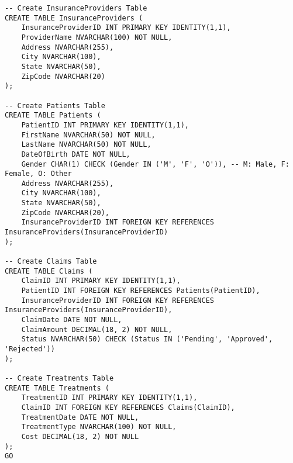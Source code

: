 \begin{lstlisting}[style=sqlstyle, caption={SQL query to Create Database}]
-- Create InsuranceProviders Table
CREATE TABLE InsuranceProviders (
    InsuranceProviderID INT PRIMARY KEY IDENTITY(1,1),
    ProviderName NVARCHAR(100) NOT NULL,
    Address NVARCHAR(255),
    City NVARCHAR(100),
    State NVARCHAR(50),
    ZipCode NVARCHAR(20)
);

-- Create Patients Table
CREATE TABLE Patients (
    PatientID INT PRIMARY KEY IDENTITY(1,1),
    FirstName NVARCHAR(50) NOT NULL,
    LastName NVARCHAR(50) NOT NULL,
    DateOfBirth DATE NOT NULL,
    Gender CHAR(1) CHECK (Gender IN ('M', 'F', 'O')), -- M: Male, F: Female, O: Other
    Address NVARCHAR(255),
    City NVARCHAR(100),
    State NVARCHAR(50),
    ZipCode NVARCHAR(20),
    InsuranceProviderID INT FOREIGN KEY REFERENCES InsuranceProviders(InsuranceProviderID)
);

-- Create Claims Table
CREATE TABLE Claims (
    ClaimID INT PRIMARY KEY IDENTITY(1,1),
    PatientID INT FOREIGN KEY REFERENCES Patients(PatientID),
    InsuranceProviderID INT FOREIGN KEY REFERENCES InsuranceProviders(InsuranceProviderID),
    ClaimDate DATE NOT NULL,
    ClaimAmount DECIMAL(18, 2) NOT NULL,
    Status NVARCHAR(50) CHECK (Status IN ('Pending', 'Approved', 'Rejected'))
);

-- Create Treatments Table
CREATE TABLE Treatments (
    TreatmentID INT PRIMARY KEY IDENTITY(1,1),
    ClaimID INT FOREIGN KEY REFERENCES Claims(ClaimID),
    TreatmentDate DATE NOT NULL,
    TreatmentType NVARCHAR(100) NOT NULL,
    Cost DECIMAL(18, 2) NOT NULL
);
GO
\end{lstlisting}
